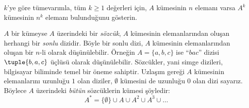\documentclass[../../../include/open-logic-section]{subfiles}
\begin{document}
\begin{prob}
$k$'ye göre tümevarımla, tüm $k \ge 1$ değerleri için, $A$ kümesinin $n$
elemanı varsa $A^k$ kümesinin $n^k$ elemanı bulunduğunu
gösterin.
\end{prob}

\begin{ex}
$A$ bir kümeyse $A$ üzerindeki bir \emph{sözcük}, $A$ kümesinin
elemanlarından oluşan herhangi bir \emph{sonlu} dizidir. Böyle bir sonlu dizi,
$A$ kümesinin elemanlarından oluşan bir $n$-li olarak düşünülebilir. Örneğin
$A = \{a, b, c\}$ ise ``$bac$'' dizisi $\tuple{b, a, c}$ üçlüsü olarak
düşünülebilir. Sözcükler, yani simge dizileri, bilgisayar biliminde temel bir
öneme sahiptir. Uzlaşım gereği $A$ kümesinin elemanlarını uzunluğu
$1$ olan diziler, $\emptyset$ kümesini de uzunluğu $0$ olan dizi sayarız.
Böylece $A$ üzerindeki \emph{bütün} sözcüklerin kümesi şöyledir:
\[
A^* = \{\emptyset\} \cup A \cup A^2 \cup A^3 \cup \dots
\]
\end{ex}
\end{document}
